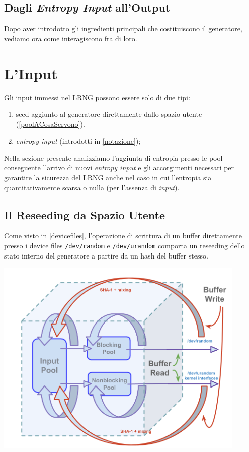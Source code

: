 \documentclass{article}
\begin{document}
\subsection{Dagli \emph{Entropy Input} all'Output}
Dopo aver introdotto gli ingredienti principali che costituiscono il generatore,
vediamo ora come interagiscono fra di loro.

  
 \section{L'Input}
 Gli input immessi nel LRNG possono essere solo di due tipi:
\begin{enumerate}
  \item seed aggiunto al generatore direttamente dallo spazio utente
  (\ref{poolACosaServono}).
  \item \emph{entropy input} (introdotti in \ref{notazione});
\end{enumerate}
 Nella sezione presente analizziamo l'aggiunta di entropia presso le pool
 conseguente l'arrivo di nuovi \emph{entropy input} e gli accorgimenti necessari
 per garantire la sicurezza del LRNG anche nel caso in cui l'entropia sia
 quantitativamente scarsa o nulla (per l'assenza di \emph{input}).
 
 \subsection{Il Reseeding da Spazio Utente}\label{reseeding}
 Come visto in \ref{devicefiles}, l'operazione di scrittura di un buffer
 direttamente presso i device files \verb+/dev/random+ e \verb+/dev/urandom+
 comporta un reseeding dello stato interno del generatore a partire da un hash
 del buffer stesso. 
 
    \centerline{\includegraphics[width=120mm]{img/bufferRW.png}}
 
\end{document}
